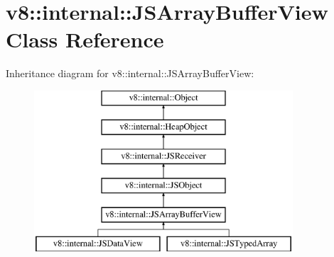 \hypertarget{classv8_1_1internal_1_1_j_s_array_buffer_view}{}\section{v8\+:\+:internal\+:\+:J\+S\+Array\+Buffer\+View Class Reference}
\label{classv8_1_1internal_1_1_j_s_array_buffer_view}
Inheritance diagram for v8\+:\+:internal\+:\+:J\+S\+Array\+Buffer\+View\+:\begin{figure}[H]
\begin{center}
\leavevmode
\includegraphics[height=6.000000cm]{classv8_1_1internal_1_1_j_s_array_buffer_view}
\end{center}
\end{figure}
